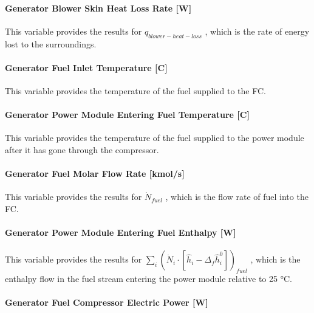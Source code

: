 \paragraph{Generator Blower Skin Heat Loss Rate {[}W{]}}\label{generator-blower-skin-heat-loss-rate-w}

This variable provides the results for \({q_{blower - heat - loss}}\) , which is the rate of energy lost to the surroundings.

\paragraph{Generator Fuel Inlet Temperature {[}C{]}}\label{generator-fuel-inlet-temperature-c}

This variable provides the temperature of the fuel supplied to the FC.

\paragraph{Generator Power Module Entering Fuel Temperature {[}C{]}}\label{generator-power-module-entering-fuel-temperature-c}

This variable provides the temperature of the fuel supplied to the power module after it has gone through the compressor.

\paragraph{Generator Fuel Molar Flow Rate {[}kmol/s{]}}\label{generator-fuel-molar-flow-rate-kmols-1}

This variable provides the results for \({\dot N_{fuel}}\) , which is the flow rate of fuel into the FC.

\paragraph{Generator Power Module Entering Fuel Enthalpy {[}W{]}}\label{generator-power-module-entering-fuel-enthalpy-w}

This variable provides the results for \({\sum\limits_i {\left( {{{\dot N}_i} \cdot \left[ {{{\hat h}_i} - {\Delta_f}\hat h_i^0} \right]} \right)}_{fuel}}\) , which is the enthalpy flow in the fuel stream entering the power module relative to 25 °C.

\paragraph{Generator Fuel Compressor Electric Power {[}W{]}}\label{generator-fuel-compressor-electric-power-w}

